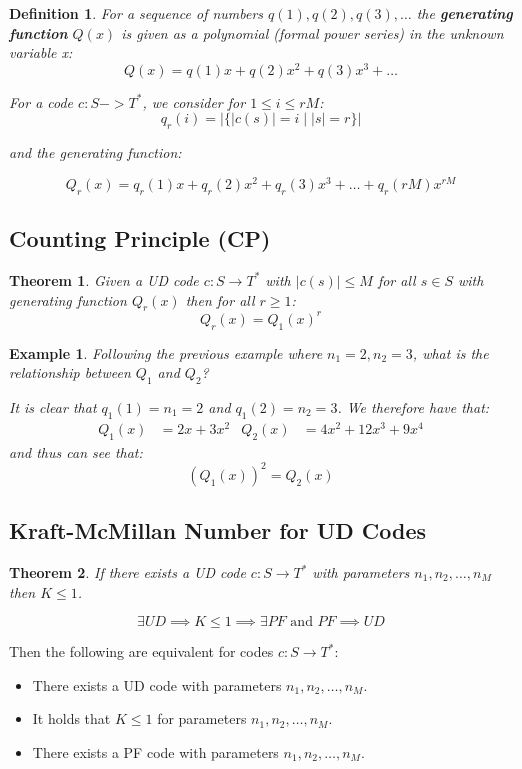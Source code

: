 \documentclass[11pt]{article}
\newtheorem{defn}{Definition}
\newtheorem{eg}{Example}
\newtheorem{theo}{Theorem}
\begin{document}
\begin{defn}
  For a sequence of numbers $q(1), q(2), q(3), \ldots$ the \textbf{generating function} $Q(x)$ is given as a polynomial (formal power series) in the unknown variable x:
  \[
    Q(x) = q(1)x + q(2)x^2 + q(3)x^3 + \ldots 
  \]

  For a code $c : S -> T^*$, we consider for $1 \leq i \leq rM$:
  \[
    q_r(i) = \lvert \{ \lvert c(s) \rvert = i \mid \lvert s \rvert = r \} \rvert
  \]

  and the generating function: 

  \[
    Q_r(x) = q_r(1)x + q_r(2)x^2 + q_r(3)x^3 + \ldots + q_r(rM)x^{rM}
  \]
\end{defn}

\subsection{Counting Principle (CP)}
\begin{theo}
  Given a UD code $c : S \rightarrow T^*$ with $\lvert c(s) \rvert \leq M$ for all $s \in S$ with generating function $Q_r(x)$ then for all $r \geq 1$:
  \[
    Q_r(x) = Q_1(x)^r
  \]
\end{theo}

\begin{eg}
  Following the previous example where $n_1 = 2, n_2 = 3$, what is the relationship between $Q_1$ and $Q_2$?

  It is clear that $q_1(1) = n_1 = 2$ and $q_1(2) = n_2 = 3$.
  We therefore have that:
  \begin{align*}
    Q_1(x) &= 2x + 3x^2 & Q_2(x) &= 4x^2 + 12x^3 + 9x^4
  \end{align*}
  and thus can see that:
  \[
    (Q_1(x))^2 = Q_2(x)
  \]
\end{eg}

\subsection{Kraft-McMillan Number for UD Codes}
\begin{theo}
  If there exists a UD code $c : S \rightarrow T^*$ with parameters $n_1, n_2, \ldots, n_M$ then $K \leq 1$.

  \[
    \exists UD \implies K \leq 1 \implies \exists PF \text{ and } PF \implies UD
  \]
\end{theo}

Then the following are equivalent for codes $c : S \rightarrow T^*$:
\begin{itemize}
  \item There exists a UD code with parameters $n_1, n_2, \ldots, n_M$.
  \item It holds that $K \leq 1$ for parameters $n_1, n_2, \ldots, n_M$.
  \item There exists a PF code with parameters $n_1, n_2, \ldots, n_M$.
\end{itemize}
\end{document}
